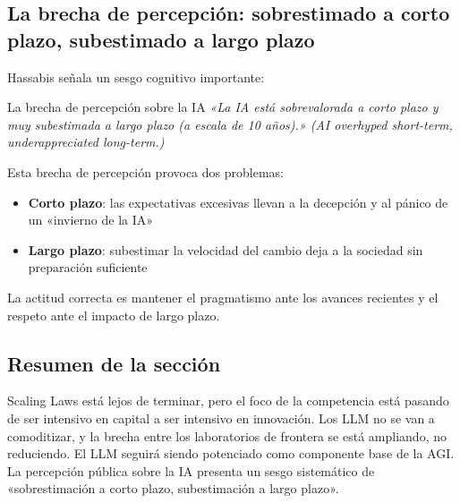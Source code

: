 \subsection{La brecha de percepción: sobrestimado a corto plazo, subestimado a largo plazo}

Hassabis señala un sesgo cognitivo importante:

\begin{importantbox}{La brecha de percepción sobre la IA}
\textit{«La IA está sobrevalorada a corto plazo y muy subestimada a largo plazo (a escala de 10 años).» (AI overhyped short-term, underappreciated long-term.)}

Esta brecha de percepción provoca dos problemas:
\begin{itemize}
    \item \textbf{Corto plazo}: las expectativas excesivas llevan a la decepción y al pánico de un «invierno de la IA»
    \item \textbf{Largo plazo}: subestimar la velocidad del cambio deja a la sociedad sin preparación suficiente
\end{itemize}
La actitud correcta es mantener el pragmatismo ante los avances recientes y el respeto ante el impacto de largo plazo.
\end{importantbox}

\subsection{Resumen de la sección}

Scaling Laws está lejos de terminar, pero el foco de la competencia está pasando de ser intensivo en capital a ser intensivo en innovación. Los LLM no se van a comoditizar, y la brecha entre los laboratorios de frontera se está ampliando, no reduciendo. El LLM seguirá siendo potenciado como componente base de la AGI. La percepción pública sobre la IA presenta un sesgo sistemático de «sobrestimación a corto plazo, subestimación a largo plazo».

